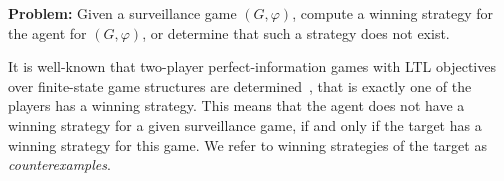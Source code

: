 \bigskip
{\bf Problem:} Given a surveillance game $(G,\varphi)$, compute a winning strategy for the agent for $(G,\varphi)$, or determine that such a strategy does not exist.


It is well-known that two-player perfect-information games with LTL objectives over finite-state game structures are determined~\cite{BorelDeterminacy}, that is exactly one of the players has a winning strategy. This means that the agent does not have a winning strategy for a given surveillance game, if and only if the target has a winning strategy for this game. We refer to winning strategies of the target as \emph{counterexamples}.